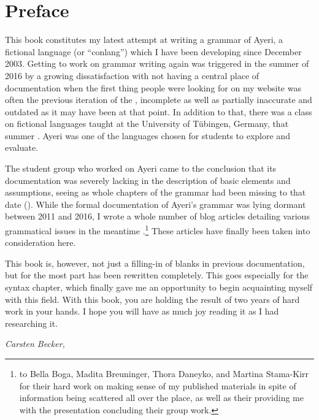 \chapter{Preface}

This book constitutes my latest attempt at writing a grammar of Ayeri, a
fictional language (or \enquote{conlang}) which I have been developing since
December 2003. Getting to work on grammar writing again was triggered in the
summer of 2016 by a growing dissatisfaction with not having a central place of
documentation when the first thing people were looking for on my website was
often the previous iteration of the , incomplete as well as
partially inaccurate and outdated as it may have been at that point. In
addition to that, there was a class on fictional languages taught at the
University of Tübingen, Germany, that summer \autocite{buch2016ss}. Ayeri was
one of the languages chosen for students to explore and evaluate.

The student group who worked on Ayeri came to the conclusion that its
documentation was severely lacking in the description of basic elements and
assumptions, seeing as whole chapters of the grammar had been missing to that
date (\cite[12]{boga2016}). While the formal documentation of Ayeri's grammar
was lying dormant between 2011 and 2016, I wrote a whole number of blog
articles detailing various grammatical issues in the meantime
\autocite[Blog]{benung}.\footnote{ to Bella Boga, Madita Breuninger, Thora Daneyko, and Martina Stama-Kirr
for their hard work on making sense of my published materials in spite of
information being scattered all over the place, as well as their providing me
with the presentation concluding their group work.} These articles have
finally been taken into consideration here.

This book is, however, not just a filling-in of blanks in previous
documentation, but for the most part has been rewritten completely. This goes
especially for the syntax chapter, which finally gave me an opportunity to
begin acquainting myself with this field. With this book, you are holding the
result of two years of hard work in your hands. I hope you will have as much
joy reading it as I had researching it.

\begin{flushright}\itshape\footnotesize
{}
Carsten Becker,  \the\year
\end{flushright}